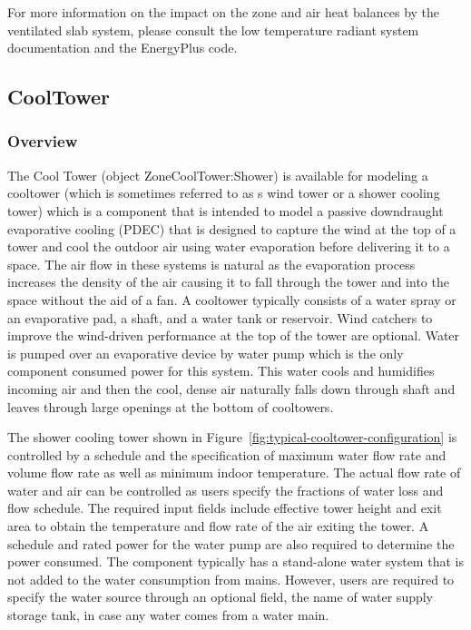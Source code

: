 For more information on the impact on the zone and air heat balances by the ventilated slab system, please consult the low temperature radiant system documentation and the EnergyPlus code.

\subsection{CoolTower}\label{cooltower}

\subsubsection{Overview}\label{overview-11-000}

The Cool Tower (object ZoneCoolTower:Shower) is available for modeling a cooltower (which is sometimes referred to as s wind tower or a shower cooling tower) which is a component that is intended to model a passive downdraught evaporative cooling (PDEC) that is designed to capture the wind at the top of a tower and cool the outdoor air using water evaporation before delivering it to a space. The air flow in these systems is natural as the evaporation process increases the density of the air causing it to fall through the tower and into the space without the aid of a fan. A cooltower typically consists of a water spray or an evaporative pad, a shaft, and a water tank or reservoir. Wind catchers to improve the wind-driven performance at the top of the tower are optional. Water is pumped over an evaporative device by water pump which is the only component consumed power for this system. This water cools and humidifies incoming air and then the cool, dense air naturally falls down through shaft and leaves through large openings at the bottom of cooltowers.

The shower cooling tower shown in Figure~\ref{fig:typical-cooltower-configuration} is controlled by a schedule and the specification of maximum water flow rate and volume flow rate as well as minimum indoor temperature. The actual flow rate of water and air can be controlled as users specify the fractions of water loss and flow schedule. The required input fields include effective tower height and exit area to obtain the temperature and flow rate of the air exiting the tower. A schedule and rated power for the water pump are also required to determine the power consumed. The component typically has a stand-alone water system that is not added to the water consumption from mains. However, users are required to specify the water source through an optional field, the name of water supply storage tank, in case any water comes from a water main.

